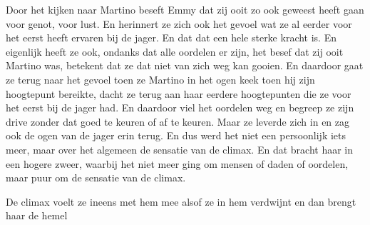 Door het kijken naar Martino beseft Emmy dat zij ooit zo ook geweest heeft gaan voor genot, voor lust. En herinnert ze zich ook het gevoel wat ze al eerder voor het eerst heeft ervaren bij de jager. En dat dat een hele sterke kracht is. En eigenlijk heeft ze ook, ondanks dat alle oordelen er zijn, het besef dat zij ooit Martino was, betekent dat ze dat niet van zich weg kan gooien. En daardoor gaat ze terug naar het gevoel toen ze Martino in het ogen keek toen hij zijn hoogtepunt bereikte, dacht ze terug aan haar eerdere hoogtepunten die ze voor het eerst bij de jager had. En daardoor viel het oordelen weg en begreep ze zijn drive zonder dat goed te keuren of af te keuren. Maar ze leverde zich in en zag ook de ogen van de jager erin terug. En dus werd het niet een persoonlijk iets meer, maar over het algemeen de sensatie van de climax. En dat bracht haar in een hogere zweer, waarbij het niet meer ging om mensen of daden of oordelen, maar puur om de sensatie van de climax.

De climax voelt ze ineens met hem mee alsof ze in hem verdwijnt en dan brengt haar de hemel
